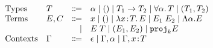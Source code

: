 \[
\begin{array}{llrl}
  \text{Types}       & T    & \Coloneqq & \alpha \mid () \mid {T_1} \to {T_2} \mid \forall \alpha. \, T \mid (T_1, T_2) \\
  \text{Terms} & E, C & \Coloneqq & x \mid () \mid \lambda x \!:\! T.\, E \mid E_1 \; E_2 \mid \Lambda \alpha. E \\ 
                     &      & \mid      & E \; T \mid (E_1, E_2) \mid {\texttt {proj}}_{k} E \\
  \text{Contexts} & \Gamma & \Coloneqq & \epsilon \mid \Gamma, \alpha \mid \Gamma, x \!:\! T \\
\end{array}
\]
